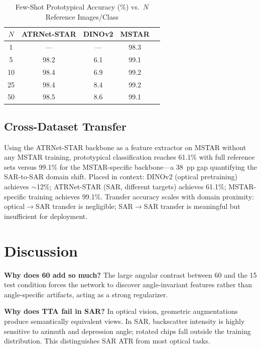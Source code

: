 \documentclass[journal]{IEEEtran}
\begin{document}
\begin{table}[t]
  \caption{Few-Shot Prototypical Accuracy (\%) vs.\ $N$ Reference Images/Class}
  \label{tab:proto}
  \centering
  \begin{tabular}{ccccc}
    \toprule
    $N$ & ATRNet-STAR & DINOv2 & MSTAR \\
    \midrule
    1  & ---  & ---  & 98.3 \\
    5  & 98.2 & 6.1  & 99.1 \\
    10 & 98.4 & 6.9  & 99.2 \\
    25 & 98.4 & 8.4  & 99.2 \\
    50 & 98.5 & 8.6  & 99.1 \\
    \bottomrule
  \end{tabular}
\end{table}

\subsection{Cross-Dataset Transfer}

Using the ATRNet-STAR backbone as a feature extractor on MSTAR without any
MSTAR training, prototypical classification reaches 61.1\% with full reference
sets versus 99.1\% for the MSTAR-specific backbone---a 38~pp gap quantifying
the SAR-to-SAR domain shift. Placed in context: DINOv2 (optical pretraining)
achieves $\sim$12\%; ATRNet-STAR (SAR, different targets) achieves 61.1\%;
MSTAR-specific training achieves 99.1\%. Transfer accuracy scales with domain
proximity: optical$\to$SAR transfer is negligible; SAR$\to$SAR transfer is
meaningful but insufficient for deployment.

\section{Discussion}

\textbf{Why does 60\textdegree{} add so much?} The large angular contrast
between 60\textdegree{} and the 15\textdegree{} test condition forces the
network to discover angle-invariant features rather than angle-specific
artifacts, acting as a strong regularizer.

\textbf{Why does TTA fail in SAR?} In optical vision, geometric augmentations
produce semantically equivalent views. In SAR, backscatter intensity is
highly sensitive to azimuth and depression angle; rotated chips fall outside
the training distribution. This distinguishes SAR ATR from most optical tasks.
\end{document}
